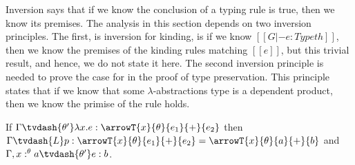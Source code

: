 Inversion says that if we know the conclusion of a typing rule is
true, then we know its premises.  The analysis in this section depends
on two inversion principles.  The first, is inversion for kinding, is
if we know $[[G |- e : Type th]]$, then we know the premises of the
kinding rules matching $[[e]]$, but this trivial result, and hence, we
do not state it here.  The second inversion principle is needed to
prove the case for  in the proof of type
preservation.  This principle states that if we know that some
$\lambda$-abstractions type is a dependent product, then we know the
primise of the  rule holds.

\begin{lemma}[Inversion]
  \label{lemma:inversion}
  If $\Gamma \tvdash{\theta'} \lambda x.e:\arrowT{x}{\theta}{e_1}{+}{e_2}$ 
  then 
  $\Gamma \tvdash{L} p:\arrowT{x}{\theta}{e_1}{+}{e_2} = \arrowT{x}{\theta}{a}{+}{b}$
  and
  $\Gamma,x:^\theta a \tvdash{\theta'} e:b$.
\end{lemma}
